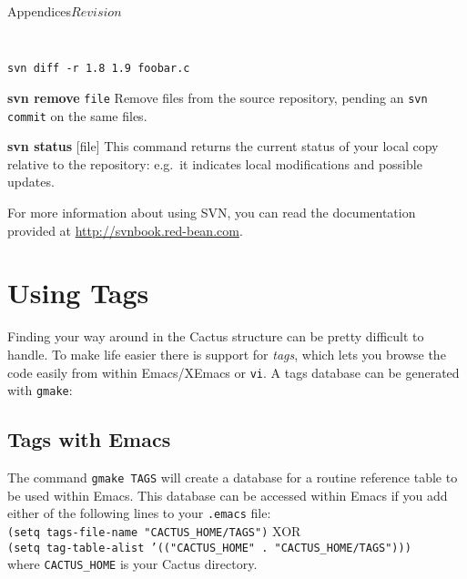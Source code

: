 \begin{cactuspart}{Appendices}{}{$Revision$}
\begin{Lentry}
{\tt
\begin{verbatim}
svn diff -r 1.8 1.9 foobar.c
\end{verbatim}
}

\item[{\bf svn remove} {\tt file}]
Remove files from the source repository, pending  an {\tt svn commit} on
the same files.

\item[{\bf svn status} {[}file{]}]
This command returns the current status of your local copy relative to
the repository: e.g.\ it indicates local modifications and possible
updates.

\end{Lentry}

For more information about using SVN, you can read the documentation
provided at \url{http://svnbook.red-bean.com}.


\chapter{Using Tags}
\label{sec:Appendix.tags}
Finding your way around in the Cactus structure can be pretty
difficult to handle. To make life easier there is support for \textit{tags},
which lets you browse the code easily from within Emacs/XEmacs or {\tt vi}.
A tags database can be generated with {\tt gmake}:

\section{Tags with Emacs}

The command {\tt gmake TAGS} will create a database for a routine reference
table to be used within Emacs. This database can be accessed within
Emacs if you add either of the following lines to your {\tt .emacs} file:\\
{\tt (setq tags-file-name "CACTUS\_HOME/TAGS")} XOR \\
{\tt (setq tag-table-alist '(("CACTUS\_HOME" . "CACTUS\_HOME/TAGS")))}\\
where {\tt CACTUS\_HOME} is your Cactus directory.\\


\end{cactuspart}
